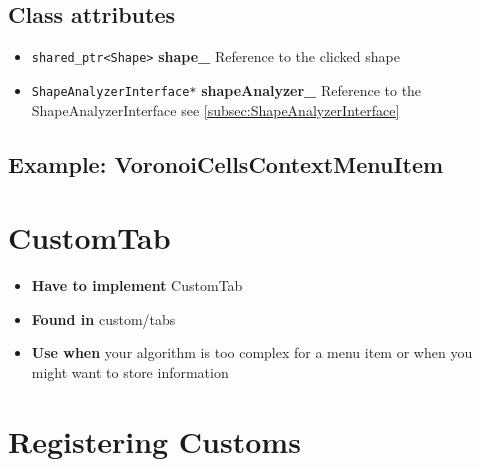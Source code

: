 \subsection{Class attributes}
\begin{itemize}
	\item \texttt{shared_ptr<Shape>} \textbf{shape_} Reference to the clicked shape
	\item \texttt{ShapeAnalyzerInterface*} \textbf{shapeAnalyzer_} Reference to the ShapeAnalyzerInterface see \ref{subsec:ShapeAnalyzerInterface}
\end{itemize}

\subsection{Example: VoronoiCellsContextMenuItem}
\label{subsec:ExampleVoronoiCellsContextMenuItem}

\section{CustomTab}
\label{sec:CustomTab}

\begin{itemize}
	\item \textbf{Have to implement} CustomTab
	\item \textbf{Found in} custom/tabs
	\item \textbf{Use when} your algorithm is too complex for a menu item or when you might want to store information
\end{itemize}



\section{Registering Customs}
\label{sec:RegisterCustoms}